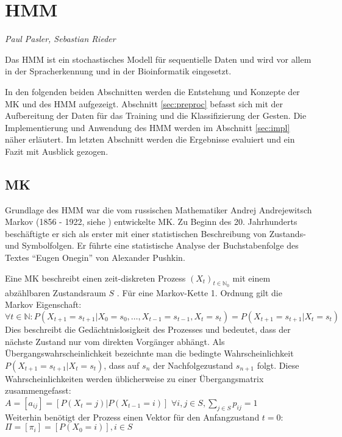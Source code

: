 ﻿\section{\acl{HMM}}
\label{mainsec:hmm}
\textit{Paul Pasler, Sebastian Rieder}

Das \acl{HMM} ist ein stochastisches Modell für sequentielle Daten und wird vor allem in der Spracherkennung und in der Bioinformatik eingesetzt.

In den folgenden beiden Abschnitten werden die Entstehung und Konzepte der \acl{MK} und des \acl{HMM} aufgezeigt.
Abschnitt \ref{sec:preproc} befasst sich mit der Aufbereitung der Daten für das Training und die Klassifizierung der Gesten.
Die Implementierung und Anwendung des \acl{HMM} werden im Abschnitt \ref{sec:impl} näher erläutert. Im letzten Abschnitt werden die Ergebnisse 
evaluiert und ein Fazit mit Ausblick gezogen.  
 
\subsection{\acl{MK}} \label{sec:chain}
Grundlage des \acl{HMM} war die vom russischen Mathematiker Andrej Andrejewitsch Markov 
(1856 - 1922, siehe \cite{markov1913}) entwickelte \acl{MK}. Zu Beginn des
20. Jahrhunderts beschäftigte er sich als erster mit einer statistischen Beschreibung von Zustands- und Symbolfolgen. 
Er führte eine statistische Analyse der Buchstabenfolge des Textes ``Eugen Onegin'' von Alexander 
Pushkin.

Eine \acl{MK} beschreibt einen zeit-diskreten Prozess \((X_t)_{t\in\mathbb{N}_0}\) mit einem abzählbaren Zustandsraum \(S\) \cite{stochMod}.
Für eine Markov-Kette 1. Ordnung gilt die Markov Eigenschaft: \\
\( \forall t \in \mathbb{N} : P (X_{t+1} = s_{t+1} | X_0 = s_0, \ldots , X_{t-1} = s_{t-1}, X_{t} = s_{t}) = P ( X_{t+1} = s_{t+1} | X_{t} = s_{t} ) \) \\
Dies beschreibt die Gedächtnislosigkeit des Prozesses und bedeutet, dass der nächste Zustand nur vom direkten Vorgänger abhängt.
Als Übergangswahrscheinlichkeit bezeichnte man die bedingte Wahrscheinlichkeit \(P ( X_{t+1} = s_{t+1} | X_{t} = s_{t} ) \), dass auf 
\( s_{n}\) der Nachfolgezustand \( s_{n+1}\) folgt. Diese Wahrscheinlichkeiten werden üblicherweise zu einer Übergangsmatrix zusammengefasst: \\
\( A = [a_{ij}] = [ P (X_t = j) | P (X_{t-1} = i) ] \)
\( \forall i, j \in S, \sum_{j \in S} p_{ij} = 1 \) \\
Weiterhin benötigt der Prozess einen Vektor für den Anfangzustand \( t = 0 \):
\( \Pi = [ \pi_i] = [ P (X_0 = i) ] , i \in S \)


